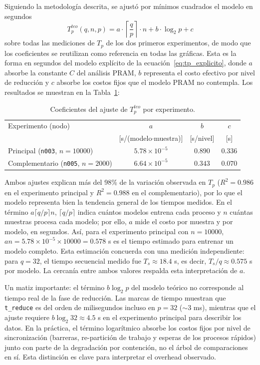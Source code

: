 \documentclass[11pt, a4paper]{article}
\begin{document}
Siguiendo la metodología descrita, se ajustó por mínimos cuadrados el modelo en segundos
\begin{equation}
T_p^{teo}(q, n, p) = a \cdot \left\lceil \frac{q}{p} \right\rceil \cdot n + b \cdot \log_2 p + c
\label{eq:tpeo}
\end{equation}
sobre todas las mediciones de $T_p$ de los dos primeros experimentos, de modo que los coeficientes se reutilizan como referencia en todas las gráficas. Esta es la forma en segundos del modelo explícito de la ecuación~\eqref{eq:tp_explicito}, donde $a$ absorbe la constante $C$ del análisis PRAM, $b$ representa el costo efectivo por nivel de reducción y $c$ absorbe los costos fijos que el modelo PRAM no contempla. Los resultados se muestran en la Tabla~\ref{tab:coef}:

\begin{table}[H]
\centering
\small
\caption{Coeficientes del ajuste de $T_p^{teo}$ por experimento.}
\label{tab:coef}
\begin{tabular}{lccc}
\toprule
Experimento (nodo) & $a$ & $b$ & $c$ \\
 & {\scriptsize[s/(modelo$\cdot$muestra)]} & {\scriptsize[s/nivel]} & {\scriptsize[s]} \\
\midrule
Principal (\texttt{n003}, $n=10000$) & $5.78 \times 10^{-5}$ & $0.890$ & $0.336$ \\
Complementario (\texttt{n005}, $n=2000$) & $6.64 \times 10^{-5}$ & $0.343$ & $0.070$ \\
\bottomrule
\end{tabular}
\end{table}

Ambos ajustes explican más del 98\% de la variación observada en $T_p$ ($R^2 = 0.986$ en el experimento principal y $R^2 = 0.988$ en el complementario), por lo que el modelo representa bien la tendencia general de los tiempos medidos. En el término $a\lceil q/p\rceil n$, $\lceil q/p\rceil$ indica cuántos modelos entrena cada proceso y $n$ cuántas muestras procesa cada modelo; por ello, $a$ mide el costo por muestra y por modelo, en segundos. Así, para el experimento principal con $n=10000$, $a n = 5.78\times10^{-5}\times10000 = 0.578$ s es el tiempo estimado para entrenar un modelo completo. Esta estimación concuerda con una medición independiente: para $q=32$, el tiempo secuencial medido fue $T_s\approx18.4$ s, es decir, $T_s/q\approx0.575$ s por modelo. La cercanía entre ambos valores respalda esta interpretación de $a$.

Un matiz importante: el término $b \log_2 p$ del modelo teórico no corresponde al tiempo real de la fase de reducción. Las marcas de tiempo muestran que \texttt{t\_reduce} es del orden de milisegundos incluso en $p = 32$ ($\sim$3 ms), mientras que el ajuste requiere $b \log_2 32 \approx 4.5$ s en el experimento principal para describir los datos. En la práctica, el término logarítmico absorbe los costos fijos por nivel de sincronización (barreras, re-partición de trabajo y esperas de los procesos rápidos) junto con parte de la degradación por contención, no el árbol de comparaciones en sí. Esta distinción es clave para interpretar el overhead observado.
\end{document}
